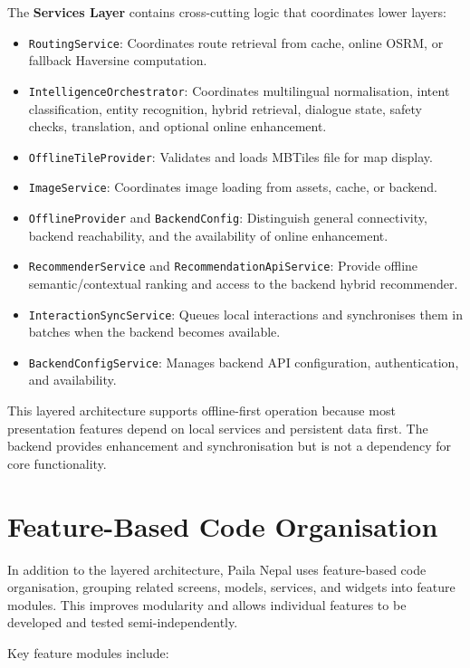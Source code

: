 \documentclass[12pt,a4paper,oneside]{report}
\begin{document}
The \textbf{Services Layer} contains cross-cutting logic that coordinates lower layers:

\begin{itemize}
\item \texttt{RoutingService}: Coordinates route retrieval from cache, online OSRM, or fallback Haversine computation.
\item \texttt{IntelligenceOrchestrator}: Coordinates multilingual normalisation, intent classification, entity recognition, hybrid retrieval, dialogue state, safety checks, translation, and optional online enhancement.
\item \texttt{OfflineTileProvider}: Validates and loads MBTiles file for map display.
\item \texttt{ImageService}: Coordinates image loading from assets, cache, or backend.
\item \texttt{OfflineProvider} and \texttt{BackendConfig}: Distinguish general connectivity, backend reachability, and the availability of online enhancement.
\item \texttt{RecommenderService} and \texttt{RecommendationApiService}: Provide offline semantic/contextual ranking and access to the backend hybrid recommender.
\item \texttt{InteractionSyncService}: Queues local interactions and synchronises them in batches when the backend becomes available.
\item \texttt{BackendConfigService}: Manages backend API configuration, authentication, and availability.
\end{itemize}

This layered architecture supports offline-first operation because most presentation features depend on local services and persistent data first. The backend provides enhancement and synchronisation but is not a dependency for core functionality.

\section{Feature-Based Code Organisation}
\label{sec:feature_org}

In addition to the layered architecture, Paila Nepal uses feature-based code organisation, grouping related screens, models, services, and widgets into feature modules. This improves modularity and allows individual features to be developed and tested semi-independently.

Key feature modules include:
\end{document}
